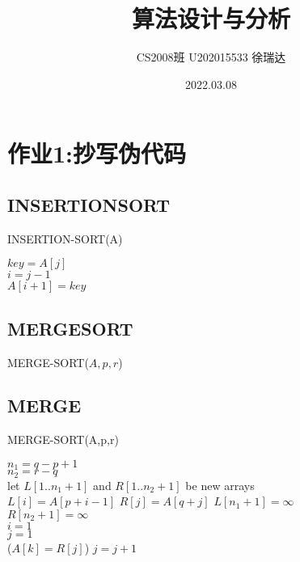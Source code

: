\documentclass[a4paper]{article}
\title{\heiti\zihao{2} 算法设计与分析}
\author{\songti CS2008班   U202015533  徐瑞达}
\date{2022.03.08}
\begin{document}
\maketitle
\section{作业1:抄写伪代码}
\subsection{INSERTIONSORT}
\begin{algorithm}[H]
    \caption{INSERTION-SORT(A)}
     {
    $key=A[j]$\\
    $i=j-1$\\
    \BlankLine
    $A[i+1]=key$
    }
\end{algorithm}
\subsection{MERGESORT}
\begin{algorithm}
    \caption{MERGE-SORT($A,p,r$)}
\end{algorithm}
\newpage
\subsection{MERGE}
\begin{algorithm}
    \caption{MERGE-SORT(A,p,r)}
    $n_{1}=q-p+1$\\
    $n_{2}=r-q$\\
    let $L[1..n_{1}+1]$ and $R[1..n_{2}+1]$ be new arrays\\
     {
    $L[i]=A[p+i-1]$
    }
     {
    $R[j]=A[q+j]$
    }
    $L[n_{1}+1]=\infty$\\
    $R[n_{2}+1]=\infty$\\
    $i=1$\\
    $j=1$\\
     {
    \BlankLine
    \Else($A[k]=R[j]$){
        $j=j+1$\\
    }
    }
\end{algorithm}
\end{document}
